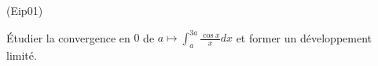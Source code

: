 \begin{tiny}(Eip01)\end{tiny}
\'Etudier la convergence en $0$ de $a\mapsto\int_{a}^{3a}\frac{\cos x}{x}dx$ et former un développement limité.
